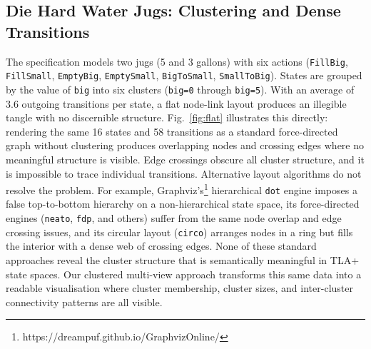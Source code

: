 \documentclass[conference]{IEEEtran}
\begin{document}
\subsection{Die Hard Water Jugs: Clustering and Dense Transitions}



The specification models two jugs (5 and 3 gallons) with six actions (\texttt{FillBig}, \texttt{FillSmall}, \texttt{EmptyBig}, \texttt{EmptySmall}, \texttt{BigToSmall}, \texttt{SmallToBig}). States are grouped by the value of \texttt{big} into six clusters (\texttt{big=0} through \texttt{big=5}). With an average of 3.6 outgoing transitions per state, a flat node-link layout produces an illegible tangle with no discernible structure. Fig.~\ref{fig:flat} illustrates this directly: rendering the same 16 states and 58 transitions as a standard force-directed graph without clustering produces overlapping nodes and crossing edges where no meaningful structure is visible. Edge crossings obscure all cluster structure, and it is impossible to trace individual transitions. Alternative layout algorithms do not resolve the problem. For example, Graphviz's\footnote{https://dreampuf.github.io/GraphvizOnline/} hierarchical \texttt{dot} engine imposes a false top-to-bottom hierarchy on a non-hierarchical state space, its force-directed engines (\texttt{neato}, \texttt{fdp}, and others) suffer from the same node overlap and edge crossing issues, and its circular layout (\texttt{circo}) arranges nodes in a ring but fills the interior with a dense web of crossing edges. None of these standard approaches reveal the cluster structure that is semantically meaningful in TLA+ state spaces. Our clustered multi-view approach transforms this same data into a readable visualisation where cluster membership, cluster sizes, and inter-cluster connectivity patterns are all visible.
\end{document}
